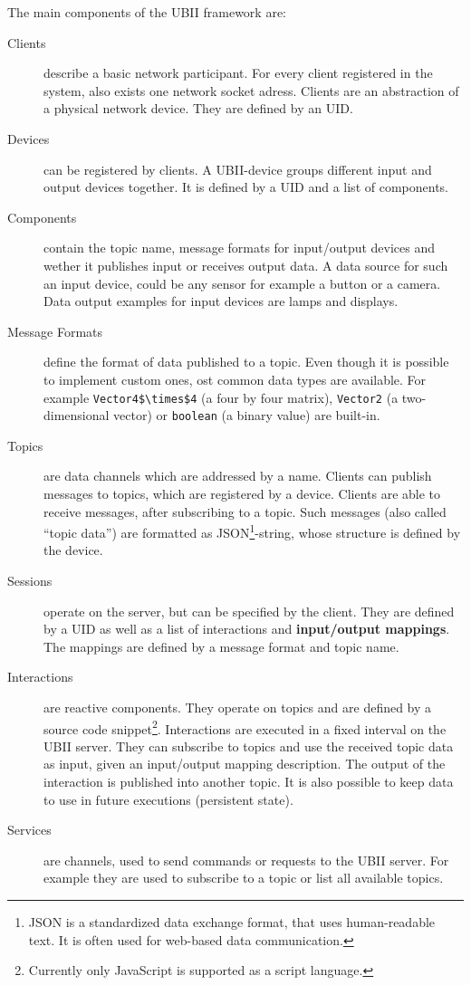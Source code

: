 The main components of the \ac{UBII} framework are:
\begin{description}
	\item[Clients] describe a basic network participant. For every client registered in the system, also exists one network socket adress. Clients are an abstraction of a physical network device. They are defined by an \ac{UID}. 
	\item[Devices] can be registered by clients. A \ac{UBII}-device groups different input and output devices together. It is defined by a \ac{UID} and a list of components.
  \item[Components] contain the topic name, message formats for input/output devices and wether it publishes input or receives output data. A data source for such an input device, could be any sensor for example a button or a camera. Data output examples for input devices are lamps and displays.
  \item[Message Formats] define the format of data published to a topic. Even though it is possible to implement custom ones, ost common data types are available. For example \lstinline[mathescape=true]{Vector4$\times$4} (a four by four matrix), \lstinline{Vector2} (a two-dimensional vector) or \lstinline{boolean} (a binary value) are built-in.
	\item[Topics] are data channels which are addressed by a name. Clients can publish messages to topics, which are registered by a device. Clients are able to receive messages, after subscribing to a topic. Such messages (also called \enquote{topic data}) are formatted as JSON\footnote{JSON is a standardized data exchange format, that uses human-readable text. It is often used for web-based data communication.}-string, whose structure is defined by the device.
	\item[Sessions] operate on the server, but can be specified by the client. They are defined by a \ac{UID} as well as a list of interactions and \textbf{input/output mappings}. The mappings are defined by a message format and topic name.
	\item[Interactions] are reactive components. They operate on topics and are defined by a source code snippet\footnote{Currently only JavaScript is supported as a script language.}. Interactions are executed in a fixed interval on the \ac{UBII} server. They can subscribe to topics and use the received topic data as input, given an input/output mapping description. The output of the interaction is published into another topic. It is also possible to keep data to use in future executions (persistent state).
	\item[Services] are channels, used to send commands or requests to the \ac{UBII} server. For example they are used to subscribe to a topic or list all available topics.
\end{description}

